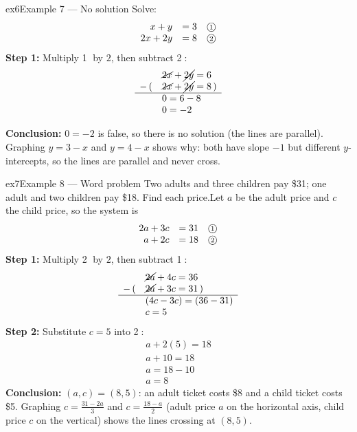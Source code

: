 \documentclass[11pt]{article}
\begin{document}
\begin{example}{ex6}{Example 7 --- No solution}
Solve:\[\begin{array}{rll} x+y & = 3 & \text{\textcircled{\scriptsize 1}}\\ 2x+2y & = 8 & \text{\textcircled{\scriptsize 2}} \end{array}\]\soln
\textbf{Step 1:} Multiply \textcircled{\scriptsize 1} by $2$, then subtract \textcircled{\scriptsize 2}:\[\begin{array}{rl} & \cancel{2x}+\cancel{2y}=6\\ -\,( & \cancel{2x}+\cancel{2y}=8\,)\\ \hline & 0=6-8\\ & 0=-2 \end{array}\]

\textbf{Conclusion:} $0=-2$ is false, so there is no solution (the lines are parallel).
Graphing $y=3-x$ and $y=4-x$ shows why: both have slope $-1$ but different $y$-intercepts, so the lines are parallel and never cross.
\end{example}

\begin{example}{ex7}{Example 8 --- Word problem}
Two adults and three children pay \$31; one adult and two children pay \$18. Find each price.\soln Let $a$ be the adult price and $c$ the child price, so the system is\[\begin{array}{rll} 2a+3c & = 31 & \text{\textcircled{\scriptsize 1}}\\ a+2c & = 18 & \text{\textcircled{\scriptsize 2}} \end{array}\]
\textbf{Step 1:} Multiply \textcircled{\scriptsize 2} by $2$, then subtract \textcircled{\scriptsize 1}:\[\begin{array}{rl} & \cancel{2a}+4c=36\\ -\,( & \cancel{2a}+3c=31\,)\\ \hline & (4c-3c)=(36-31)\\ & c=5 \end{array}\]
\textbf{Step 2:} Substitute $c=5$ into \textcircled{\scriptsize 2}:\[\begin{array}{l} a+2(5)=18\\ a+10=18\\ a=18-10\\ a=8 \end{array}\]
\textbf{Conclusion:} $(a,c)=(8,5)$: an adult ticket costs \$8 and a child ticket costs \$5.
Graphing $c=\tfrac{31-2a}3$ and $c=\tfrac{18-a}2$ (adult price $a$ on the horizontal axis, child price $c$ on the vertical) shows the lines crossing at $(8,5)$.
\end{example}
\end{document}
